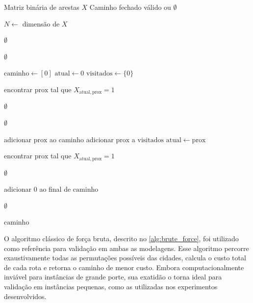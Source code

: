     \begin{algorithm}[htbp]
    \caption{Validação da matriz binária como ciclo Hamiltoniano}
    \label{alg:matriz_para_caminho}
    \begin{algorithmic}[1]
    \Require Matriz binária de arestas $X$
    \Ensure Caminho fechado válido ou $\emptyset$

    \State $N \gets$ dimensão de $X$

        \State \Return $\emptyset$
    \EndIf

        \State \Return $\emptyset$
    \EndIf

    \State $\mathrm{caminho} \gets [0]$
    \State $\mathrm{atual} \gets 0$
    \State $\mathrm{visitados} \gets \{0\}$

        \State encontrar $\mathrm{prox}$ tal que $X_{\mathrm{atual},\mathrm{prox}}=1$

            \State \Return $\emptyset$
        \EndIf

            \State \Return $\emptyset$
        \EndIf

        \State adicionar $\mathrm{prox}$ ao caminho
        \State adicionar $\mathrm{prox}$ a $\mathrm{visitados}$
        \State $\mathrm{atual} \gets \mathrm{prox}$
    \EndFor

    \State encontrar $\mathrm{prox}$ tal que $X_{\mathrm{atual},\mathrm{prox}}=1$

        \State \Return $\emptyset$
    \EndIf

    \State adicionar $0$ ao final de $\mathrm{caminho}$

        \State \Return $\emptyset$
    \EndIf

    \State \Return $\mathrm{caminho}$
    \end{algorithmic}
    \end{algorithm}




    O algoritmo clássico de força bruta, descrito no \autoref{alg:brute_force}, foi utilizado como referência para validação em ambas as modelagens. Esse algoritmo percorre exaustivamente todas as permutações possíveis das cidades, calcula o custo total de cada rota e retorna o caminho de menor custo. Embora computacionalmente inviável para instâncias de grande porte, sua exatidão o torna ideal para validação em instâncias pequenas, como as utilizadas nos experimentos desenvolvidos.

